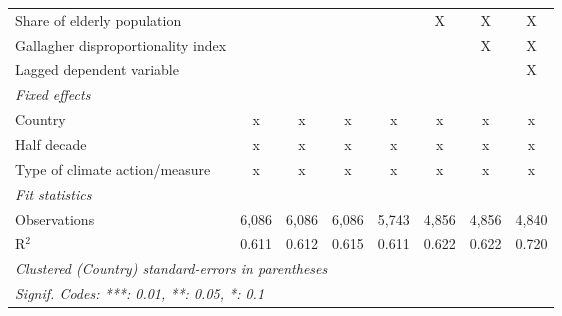 \begin{tabular}{lccccccc}
   Share of elderly population                                                               &               &              &              &             & X       & X       & X\\  
   Gallagher disproportionality index                                                        &               &              &              &             &         & X       & X\\  
   Lagged dependent variable                                                                 &               &              &              &             &         &         & X\\  
   \emph{Fixed effects}\\
   Country                                                                                   & x             & x            & x            & x           & x       & x       & x\\  
   Half decade                                                                               & x             & x            & x            & x           & x       & x       & x\\  
   Type of climate action/measure                                                            & x             & x            & x            & x           & x       & x       & x\\  
   \midrule \emph{Fit statistics}\\
   Observations                                                                              & 6,086         & 6,086        & 6,086        & 5,743       & 4,856   & 4,856   & 4,840\\  
   R$^2$                                                                                     & 0.611         & 0.612        & 0.615        & 0.611       & 0.622   & 0.622   & 0.720\\  
   \midrule
   \multicolumn{8}{l}{\emph{Clustered (Country) standard-errors in parentheses}}\\
   \multicolumn{8}{l}{\emph{Signif. Codes: ***: 0.01, **: 0.05, *: 0.1}}\\
\end{tabular}
\par\endgroup


